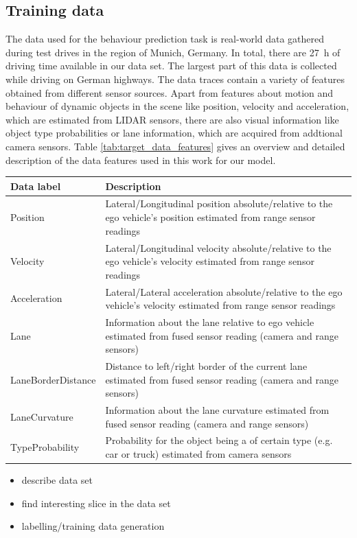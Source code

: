 \subsection{Training data}
The data used for the behaviour prediction task is real-world data gathered during test drives in the region of Munich, Germany.
In total, there are \SI{27}{\hour} of driving time available in our data set.
The largest part of this data is collected while driving on German highways.
The data traces contain a variety of features obtained from different sensor sources.
Apart from features about motion and behaviour of dynamic objects in the scene like position, velocity and acceleration, which are estimated from \ac{LIDAR} sensors, there are also visual information like object type probabilities or lane information, which are acquired from addtional camera sensors.
Table \ref{tab:target_data_features} gives an overview and detailed description of the data features used in this work for our model.
\begin{center}
	\begin{tabular}{|l | p{12cm}|}
		\hline
		\textbf{Data label} & \textbf{Description}\\ \hline
		Position & Lateral/Longitudinal position absolute/relative to the ego vehicle's position estimated from range sensor readings \\ \hline
		Velocity& Lateral/Longitudinal velocity absolute/relative to the ego vehicle's velocity estimated from range sensor readings \\ \hline
		Acceleration & Lateral/Lateral acceleration absolute/relative to the ego vehicle's velocity estimated from range sensor readings \\ \hline
		Lane & Information about the lane relative to ego vehicle estimated from fused sensor reading (camera and range sensors) \\ \hline
		LaneBorderDistance & Distance to left/right border of the current lane estimated from fused sensor reading (camera and range sensors) \\ \hline
		LaneCurvature & Information about the lane curvature estimated from fused sensor reading (camera and range sensors) \\ \hline
		TypeProbability & Probability for the object being a of certain type (e.g. car or truck) estimated from camera sensors \\ \hline
	\end{tabular}
	\label{tab:target_data_features}
\end{center}
\begin{itemize}
	\item describe data set
	\item find interesting slice in the data set
	\item labelling/training data generation
\end{itemize}

